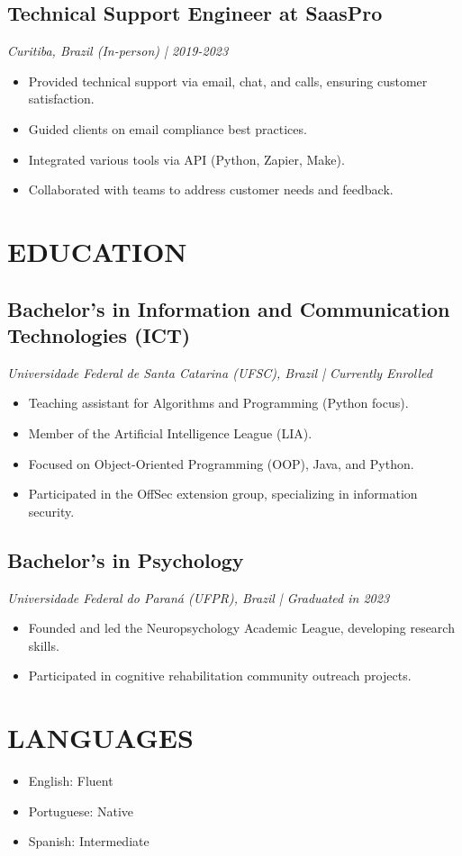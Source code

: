 \documentclass[10pt, letterpaper]{article}
\begin{document}
\subsection*{Technical Support Engineer at SaasPro}
\textit{Curitiba, Brazil (In-person) | 2019-2023}
\begin{itemize}
\item Provided technical support via email, chat, and calls, ensuring customer satisfaction.
\item Guided clients on email compliance best practices.
\item Integrated various tools via API (Python, Zapier, Make).
\item Collaborated with teams to address customer needs and feedback.
\end{itemize}


\section*{EDUCATION}
\subsection*{Bachelor’s in Information and Communication Technologies (ICT)}
\textit{Universidade Federal de Santa Catarina (UFSC), Brazil | Currently Enrolled}
\begin{itemize}
\item Teaching assistant for Algorithms and Programming (Python focus).
\item Member of the Artificial Intelligence League (LIA).
\item Focused on Object-Oriented Programming (OOP), Java, and Python.
\item Participated in the OffSec extension group, specializing in information security.
\end{itemize}

\subsection*{Bachelor’s in Psychology}
\textit{Universidade Federal do Paraná (UFPR), Brazil | Graduated in 2023}
\begin{itemize}
\item Founded and led the Neuropsychology Academic League, developing research skills.
\item Participated in cognitive rehabilitation community outreach projects.
\end{itemize}

\section*{LANGUAGES}
\begin{itemize}
\item English: Fluent
\item Portuguese: Native
\item Spanish: Intermediate
\end{itemize}
\end{document}
